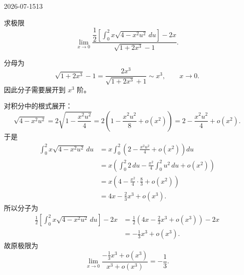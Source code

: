 \begin{mistake}{2026-07-15}{13}

\begin{problemcontent}
求极限
\[
\lim_{x\to 0}
\frac{
\dfrac12\left[\int_0^2 x\sqrt{4-x^2u^2}\,du\right]-2x
}{
\sqrt{1+2x^3}-1
}.
\]
\end{problemcontent}

\begin{solutioncontent}
分母为
\[
\sqrt{1+2x^3}-1
=\frac{2x^3}{\sqrt{1+2x^3}+1}
\sim x^3,\qquad x\to 0.
\]
因此分子需要展开到 \(x^3\) 阶。

对积分中的根式展开：
\[
\sqrt{4-x^2u^2}
=2\sqrt{1-\frac{x^2u^2}{4}}
=2\left(1-\frac{x^2u^2}{8}+o(x^2)\right)
=2-\frac{x^2u^2}{4}+o(x^2).
\]
于是
\[
\begin{aligned}
\int_0^2 x\sqrt{4-x^2u^2}\,du
&=x\int_0^2\left(2-\frac{x^2u^2}{4}+o(x^2)\right)du\\
&=x\left(\int_0^2 2\,du-\frac{x^2}{4}\int_0^2u^2\,du+o(x^2)\right)\\
&=x\left(4-\frac{x^2}{4}\cdot\frac83+o(x^2)\right)\\
&=4x-\frac23x^3+o(x^3).
\end{aligned}
\]
所以分子为
\[
\begin{aligned}
\frac12\left[\int_0^2 x\sqrt{4-x^2u^2}\,du\right]-2x
&=\frac12\left(4x-\frac23x^3+o(x^3)\right)-2x\\
&=-\frac13x^3+o(x^3).
\end{aligned}
\]
故原极限为
\[
\lim_{x\to0}\frac{-\frac13x^3+o(x^3)}{x^3+o(x^3)}=-\frac13.
\]
\end{solutioncontent}


\end{mistake}
